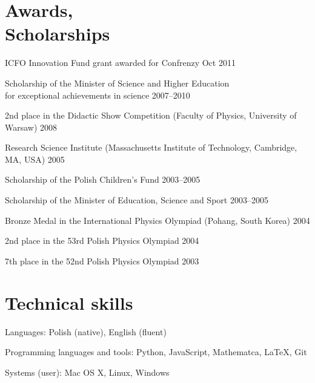 \documentclass[margin,line]{resume}
\begin{document}
\begin{resume}
    \section{\mysidestyle Awards,\\Scholarships}
    \begin{list2}
    	\item ICFO Innovation Fund grant awarded for Confrenzy \hfill Oct 2011
        \item Scholarship of the Minister of Science and Higher Education\\for exceptional achievements in science \hfill 2007--2010
        \item 2nd  place in the Didactic Show Competition (Faculty of Physics, University of Warsaw)  \hfill 2008  %
        \item Research Science Institute (Massachusetts Institute of Technology, Cambridge, MA, USA) \hfill 2005
        \item Scholarship of the Polish Children's Fund \hfill 2003--2005
        \item Scholarship of the Minister of Education, Science and Sport \hfill 2003--2005
        \item Bronze Medal in the International Physics Olympiad (Pohang, South Korea) \hfill 2004
        \item 2nd  place in the 53rd Polish Physics Olympiad \hfill 2004
        \item 7th  place in the 52nd Polish Physics Olympiad \hfill 2003
    \end{list2}

\vspace{3mm}

    \section{\mysidestyle Technical skills}
    \begin{list2}
        \item Languages: Polish (native), English (fluent)
        \item Programming languages and tools: Python, JavaScript, Mathematca, LaTeX, Git
        \item Systems (user): Mac OS X, Linux, Windows
    \end{list2}

\newpage


\end{resume}
\end{document}
